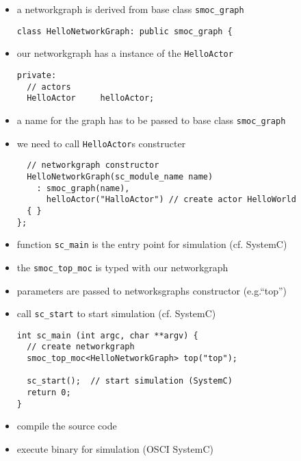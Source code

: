 \begin{frame}[fragile=singleslide]
\begin{itemize}
\item a networkgraph is derived from base class \lstinline!smoc_graph!
\begin{lstlisting}
class HelloNetworkGraph: public smoc_graph {
\end{lstlisting}
\item our networkgraph has a instance of the \lstinline!HelloActor!
\begin{lstlisting}
private:
  // actors
  HelloActor     helloActor;
\end{lstlisting}
\item a name for the graph has to be passed to base class \lstinline!smoc_graph!
\item we need to call \lstinline!HelloActor!s constructer
\begin{lstlisting}
  // networkgraph constructor
  HelloNetworkGraph(sc_module_name name)
    : smoc_graph(name),
      helloActor("HalloActor") // create actor HelloWorld
  { }
};
\end{lstlisting}
\end{itemize}
\end{frame}

\begin{frame}[fragile=singleslide]
\begin{itemize}
\item function \lstinline!sc_main! is the entry point for simulation (cf. SystemC)
\item the \lstinline!smoc_top_moc! is typed with our networkgraph
\item parameters are passed to networksgraphs constructor (e.g.``top'')
\item call \lstinline!sc_start! to start simulation (cf. SystemC)
\begin{lstlisting}
int sc_main (int argc, char **argv) {
  // create networkgraph
  smoc_top_moc<HelloNetworkGraph> top("top");

  sc_start();  // start simulation (SystemC)
  return 0;
}
\end{lstlisting}
\item compile the source code
\item execute binary for simulation (OSCI SystemC)
\end{itemize}
\end{frame}

